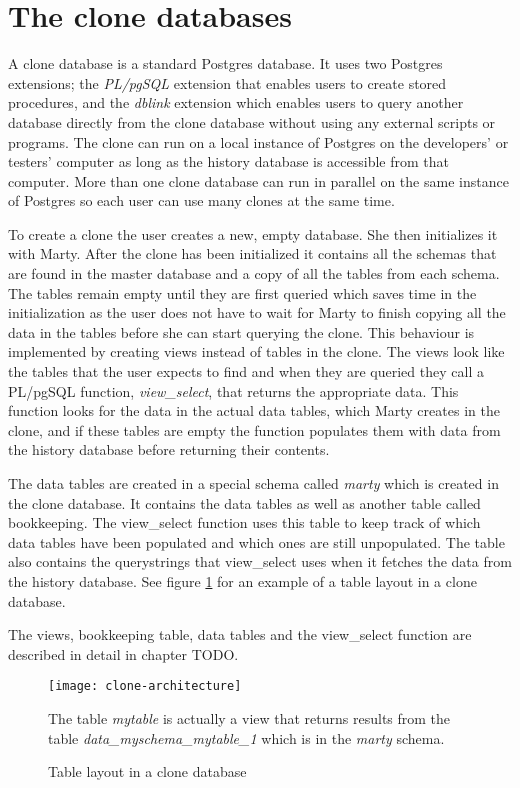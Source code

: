 \section{The clone databases}
\label{sec:clones}
A clone database is a standard Postgres database.
It uses two Postgres extensions; the \textit{PL/pgSQL} extension that enables users to create stored procedures, and the \textit{dblink} extension which enables users to query another database directly from the clone database without using any external scripts or programs.
The clone can run on a local instance of Postgres on the developers' or testers' computer as long as the history database is accessible from that computer.
More than one clone database can run in parallel on the same instance of Postgres so each user can use many clones at the same time.

To create a clone the user creates a new, empty database.
She then initializes it with Marty.
After the clone has been initialized it contains all the schemas that are found in the master database and a copy of all the tables from each schema.
The tables remain empty until they are first queried which saves time in the initialization as the user does not have to wait for Marty to finish copying all the data in the tables before she can start querying the clone.
This behaviour is implemented by creating views instead of tables in the clone.
The views look like the tables that the user expects to find and when they are queried they call a PL/pgSQL function, \textit{view\_select}, that returns the appropriate data.
This function looks for the data in the actual data tables, which Marty creates in the clone, and if these tables are empty the function populates them with data from the history database before returning their contents.

The data tables are created in a special schema called \textit{marty} which is created in the clone database.
It contains the data tables as well as another table called bookkeeping.
The view\_select function uses this table to keep track of which data tables have been populated and which ones are still unpopulated.
The table also contains the querystrings that view\_select uses when it fetches the data from the history database.
See figure \ref{clone-architecture} for an example of a table layout in a clone database.

The views, bookkeeping table, data tables and the view\_select function are described in detail in chapter TODO.

\begin{figure}[h!]
  \centering
    \texttt{[image: clone-architecture]}
  \caption{Table layout in a clone database}
  \medskip
  \small
  The table \textit{mytable} is actually a view that returns results from the table \textit{data\_myschema\_mytable\_1} which is in the \textit{marty} schema.
  \label{clone-architecture}
\end{figure}

